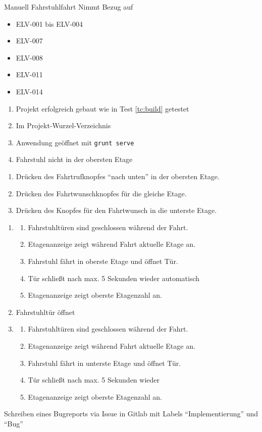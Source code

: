 \begin{testcase}{Manuell}
\tcSubject Fahrstuhlfahrt
\tcRemark Nimmt Bezug auf
	\begin{itemize}
	\item ELV-001 bis ELV-004
	\item ELV-007
	\item ELV-008
	\item ELV-011
	\item ELV-014
	\end{itemize}
\tcConditions
	\begin{enumerate}
	\item Projekt erfolgreich gebaut wie in Test \ref{tc:build} getestet
	\item Im Projekt-Wurzel-Verzeichnis
	\item Anwendung geöffnet mit \texttt{grunt serve}
	\item Fahrstuhl nicht in der obersten Etage
	\end{enumerate}
\tcProceeding
	\begin{enumerate}
	\item Drücken des Fahrtrufknopfes "`nach unten"' in der obersten Etage.
	\item Drücken des Fahrtwunschknopfes für die gleiche Etage.
	\item Drücken des Knopfes für den Fahrtwunsch in die unterste Etage.
	\end{enumerate}
\tcGoal
	\begin{enumerate}
		\item
		\begin{enumerate}
			\item Fahrstuhltüren sind geschlossen während der Fahrt.
			\item Etagenanzeige zeigt während Fahrt aktuelle Etage an.
			\item Fahrstuhl fährt in oberste Etage und öffnet Tür.
			\item Tür schließt nach max. 5 Sekunden wieder automatisch
			\item Etagenanzeige zeigt oberste Etagenzahl an.
		\end{enumerate}
		\item Fahrstuhltür öffnet
		\item
		\begin{enumerate}
			\item Fahrstuhltüren sind geschlossen während der Fahrt.
			\item Etagenanzeige zeigt während Fahrt aktuelle Etage an.
			\item Fahrstuhl fährt in unterste Etage und öffnet Tür.
			\item Tür schließt nach max. 5 Sekunden wieder
			\item Etagenanzeige zeigt oberste Etagenzahl an.
		\end{enumerate}
	\end{enumerate}
\tcError Schreiben eines Bugreports via Issue in Gitlab mit Labels "`Implementierung"' und "`Bug"'
\end{testcase}

